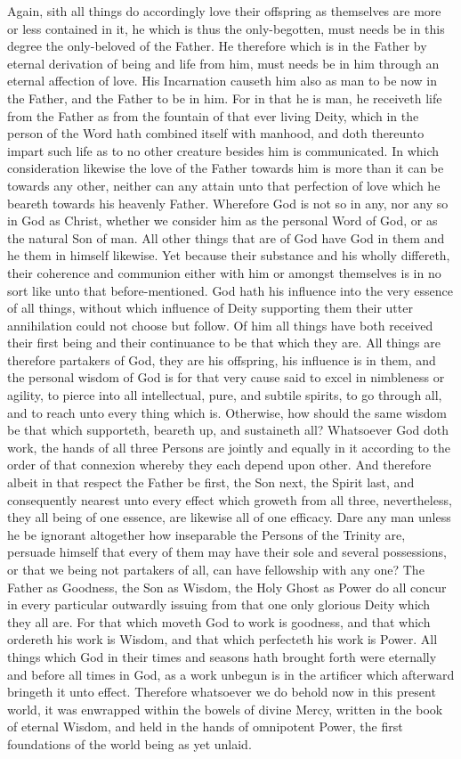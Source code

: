 Again, sith all things do accordingly love their offspring as themselves are more or less contained in it, he which  is thus the only-begotten, must needs be in this degree the only-beloved of the Father. He therefore which is in the Father by eternal derivation of being and life from him, must needs be in him through an eternal affection of love.
His Incarnation causeth him also as man to be now in the Father, and the Father to be in him. For in that he is man, he receiveth life from the Father as from the fountain of that ever living Deity, which in the person of the Word hath combined itself with manhood, and doth thereunto impart such life as to no other creature besides him is communicated. In which consideration likewise the love of the Father towards him is more than it can be towards any other, neither can any attain unto that perfection of love which he beareth towards his heavenly Father. Wherefore God is not so in any, nor any so in God as Christ, whether we consider him as the personal Word of God, or as the natural Son of man.
All other things that are of God have God in them and he them in himself likewise. Yet because their substance and his wholly differeth, their coherence and communion either with him or amongst themselves is in no sort like unto that before-mentioned.
God hath his influence into the very essence of all things, without which influence of Deity supporting them their utter annihilation could not choose but follow. Of him all things have both received their first being and their continuance to be that which they are. All things are therefore partakers of God, they are his offspring, his influence is in them, and the personal wisdom of God is for that very cause said to excel in nimbleness or agility, to pierce into all intellectual, pure, and subtile spirits, to go through all, and to reach unto every thing which is. Otherwise, how should the same wisdom be that which supporteth, beareth up, and sustaineth all?
Whatsoever God doth work, the hands of all three Persons are jointly and equally in it according to the order of that connexion whereby they each depend upon other. And therefore albeit in that respect the Father be first, the Son next, the Spirit last, and consequently nearest unto every effect  which groweth from all three, nevertheless, they all being of one essence, are likewise all of one efficacy. Dare any man unless he be ignorant altogether how inseparable the Persons of the Trinity are, persuade himself that every of them may have their sole and several possessions, or that we being not partakers of all, can have fellowship with any one? The Father as Goodness, the Son as Wisdom, the Holy Ghost as Power do all concur in every particular outwardly issuing from that one only glorious Deity which they all are. For that which moveth God to work is goodness, and that which ordereth his work is Wisdom, and that which perfecteth his work is Power. All things which God in their times and seasons hath brought forth were eternally and before all times in God, as a work unbegun is in the artificer which afterward bringeth it unto effect. Therefore whatsoever we do behold now in this present world, it was enwrapped within the bowels of divine Mercy, written in the book of eternal Wisdom, and held in the hands of omnipotent Power, the first foundations of the world being as yet unlaid.

